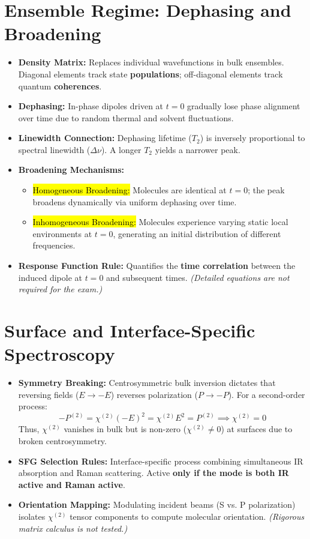 \section{Ensemble Regime: Dephasing and Broadening}
\begin{itemize}
  \item \textbf{Density Matrix:} Replaces individual wavefunctions in bulk ensembles. Diagonal elements track state \textbf{populations}; off-diagonal elements track quantum \textbf{coherences}.
  \item \textbf{Dephasing:} In-phase dipoles driven at $t = 0$ gradually lose phase alignment over time due to random thermal and solvent fluctuations.
  \item \textbf{Linewidth Connection:} Dephasing lifetime ($T_2$) is inversely proportional to spectral linewidth ($\Delta\nu$). A longer $T_2$ yields a narrower peak.
  \item \textbf{Broadening Mechanisms:}
  \begin{itemize}
    \item \hl{Homogeneous Broadening:} Molecules are identical at $t = 0$; the peak broadens dynamically via uniform dephasing over time.
    \item \hl{Inhomogeneous Broadening:} Molecules experience varying static local environments at $t = 0$, generating an initial distribution of different frequencies.
  \end{itemize}
  \item \textbf{Response Function Rule:} Quantifies the \textbf{time correlation} between the induced dipole at $t = 0$ and subsequent times. \textit{(Detailed equations are not required for the exam.)}
\end{itemize}

\section{Surface and Interface-Specific Spectroscopy}

\begin{itemize}
  \item \textbf{Symmetry Breaking:} Centrosymmetric bulk inversion dictates that reversing fields ($E \rightarrow -E$) reverses polarization ($P \rightarrow -P$). For a second-order process:
  \begin{equation}
      -P^{(2)} = \chi^{(2)}(-E)^2 = \chi^{(2)}E^2 = P^{(2)} \implies \chi^{(2)} = 0
  \end{equation}
  Thus, $\chi^{(2)}$ vanishes in bulk but is non-zero ($\chi^{(2)}\neq 0$) at surfaces due to broken centrosymmetry.
  \item \textbf{SFG Selection Rules:} Interface-specific process combining simultaneous IR absorption and Raman scattering. Active \textbf{only if the mode is both IR active and Raman active}.
  \item \textbf{Orientation Mapping:} Modulating incident beams (S vs. P polarization) isolates $\chi^{(2)}$ tensor components to compute molecular orientation. \textit{(Rigorous matrix calculus is not tested.)}
\end{itemize}

